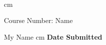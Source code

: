 \begin{titlepage}

\vspace*{5.5 cm}			%

\begin{center}				%

	\begin{LARGE}
		\textbf{} \\
	\end{LARGE}
	 cm

	\begin{large}
		Course Number: Name
	\end{large}
	\vskip 0.2cm

	\begin{normalsize}
		My Name
		\vskip 0.6 cm
		\textbf{Date Submitted}
	\end{normalsize}
	

%
%
%
%
%
%
%
%
%

\end{center}


\end{titlepage}
